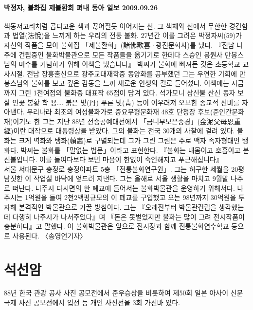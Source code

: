\documentclass[12pt, a4paper, oneside]{book}
\let\stdsection\section
\renewcommand\section{\newpage\stdsection}
\begin{document}
\paragraph{ 박정자, 불화집 제불환희 펴내 동아 일보 2009.09.26 }
색동저고리처럼 곱디고운 색과 끊어질듯 이어지는 선. 그 색채와 선에서 무한한 경건함과 법열(法悅)을 느끼게 하는 우리의 전통 불화. 27년간 이를 그려온 박정자씨(59)가 자신의 작품을 모아 불화집 「제불환희」(諸佛歡喜·광진문화사)를 냈다. 『전남 나주에 건립중인 불화박물관으로 모든 작품들을 옮기기로 한데다 스승인 봉원사 만봉스님의 미수를 기념하기 위해 이책을 냈습니다』 박씨가 불화에 빠져든 것은 초등학교 교사시절. 전남 장흥출신으로 광주교대재학중 동양화를 공부했던 그는 우연한 기회에 만봉스님의 불화를 보고 깊은 감동을 느껴 새로운 인생의 길로 들어섰다. 이책에는 지금까지 그린 1천여점의 불화중 대표작 65점이 담겨 있다. 석가모니 삼신불 산신 동자 보살 연꽃 봉황 학 용…. 붉은 빛(丹) 푸른 빛(靑) 등이 어우러져 오묘한 종교적 신비를 자아낸다. 우리나라 최초의 여성불화가로 중요무형문화재 48호 단청장 후보(준인간문화재)이기도 한 그는 지난 88년 전승공예대전에서 「금니부모은중경」(金泥父母恩重經)이란 대작으로 대통령상을 받았다. 그의 불화는 전국 30개의 사찰에 걸려 있다. 불화는 크게 벽화와 탱화(幀畵)로 구별되는데 그가 그린 그림은 주로 액자 족자형태인 탱화다. 박씨는 불화를 「말없는 법문」이라고 표현한다. 『불화는 내몸이고 호흡이고 분신불입니다. 이를 들여다보다 보면 마음이 한없이 숙연해지고 푸근해집니다』 \\
서울 서대문구 충정로 충정아파트 5층 「전통불화연구원」. 그는 허구한 세월을 20평남짓한 이 작업실 바닥에 엎드려 지낸다. 그는 올해로 서울 생활을 마치고 9월말 나주로 떠난다. 나주시 다시면의 한 폐교에 들어서는 불화박물관을 운영하기 위해서다. 나주시는 1억원을 들여 2천2백평규모의 이 폐교를 구입했고 오는 98년까지 30억원을 투자해 본격적인 박물관으로 가꿀 방침이다. 그는 『오래전부터 박물관건립을 생각했는데 다행히 나주시가 나서주었다』며 『돈은 못벌었지만 불화는 많이 그려 전시작품이 충분하다』고 말했다. 이 불화박물관은 앞으로 전시장과 함께 전통불화연수학교 등으로 사용된다. 〈송영언기자〉



	\section{ 석선암 }


\paragraph{}
88년 한국 관광 공사 사진 공모전에서 준우승상을 비롯하여 제50회 일본 아사이 신문 국제 사진 공모전에서 입선 등 개인 사진전을 3회 가진바 있다.
\end{document}
